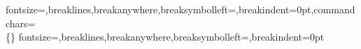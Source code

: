 %
%

\usepackage{fvextra}
%
  {fontsize=\small,breaklines,breakanywhere,breaksymbolleft={},breakindent=0pt,commandchars=\\\{\}}
%
  {fontsize=\small,breaklines,breakanywhere,breaksymbolleft={},breakindent=0pt}

\usepackage{microtype}
\setlength{\emergencystretch}{3em}
